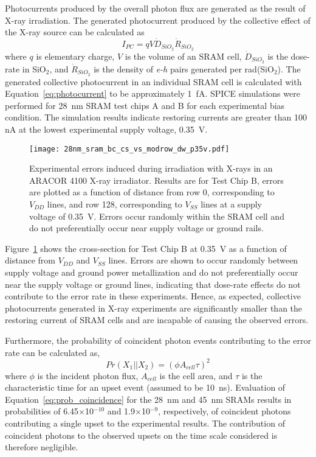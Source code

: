 Photocurrents produced by the overall photon flux are generated as the result of X-ray irradiation. 
The generated photocurrent produced by the collective effect of the X-ray source can be calculated as%
\begin{equation}
    \label{eq:photocurrent}
    I_{PC} = q V \dot{D}_{SiO_2} \dot{R}_{SiO_2}
\end{equation}
where $q$ is elementary charge, $V$ is the volume of an SRAM cell, $\dot{D}_{SiO_2}$ is the dose-rate in SiO$_2$, and $\dot{R}_{SiO_2}$ is the density of \emph{e-h} pairs generated per rad(SiO$_2$). 
The generated collective photocurrent in an individual SRAM cell is calculated with Equation~\ref{eq:photocurrent} to be approximately 1~fA. 
SPICE simulations were performed for 28~nm SRAM test chips A and B for each experimental bias condition. 
The simulation results indicate restoring currents are greater than 100 nA at the lowest experimental supply voltage, 0.35~V. 
\begin{figure}[tb]
    \begin{center}
        \texttt{[image: 28nm\_sram\_bc\_cs\_vs\_modrow\_dw\_p35v.pdf]}
    \end{center}
    \caption{Experimental errors induced during irradiation with X-rays in an ARACOR 4100 X-ray irradiator. Results are for Test Chip B, errors are plotted as a function of distance from row 0, corresponding to $V_{DD}$ lines, and row 128, corresponding to $V_{SS}$ lines at a supply voltage of 0.35~V. Errors occur randomly within the SRAM cell and do not preferentially occur near supply voltage or ground rails.}
    \label{fig:28nm_bc_cs_vs_modrow_dw_p35v}
\end{figure}
Figure~\ref{fig:28nm_bc_cs_vs_modrow_dw_p35v} shows the cross-section for Test Chip B at 0.35~V as a function of distance from $V_{DD}$ and $V_{SS}$ lines.
Errors are shown to occur randomly between supply voltage and ground power metallization and do not preferentially occur near the supply voltage or ground lines, indicating that dose-rate effects do not contribute to the error rate in these experiments.
Hence, as expected, collective photocurrents generated in X-ray experiments are significantly smaller than the restoring current of SRAM cells and are incapable of causing the observed errors.

Furthermore, the probability of coincident photon events contributing to the error rate can be calculated as,
\begin{equation}
    \label{eq:prob_coincidence}
    Pr(X_1||X_2) = (\phi A_{cell} \tau)^2
\end{equation}
where $\phi$ is the incident photon flux, $A_{cell}$ is the cell area, and $\tau$ is the characteristic time for an upset event (assumed to be 10~ns). 
Evaluation of Equation~\ref{eq:prob_coincidence} for the 28~nm and 45~nm SRAMs results in probabilities of 6.45$\times$10$^{-10}$ and 1.9$\times$10$^{-9}$, respectively, of coincident photons contributing a single upset to the experimental results. 
The contribution of coincident photons to the observed upsets on the time scale considered is therefore negligible.

